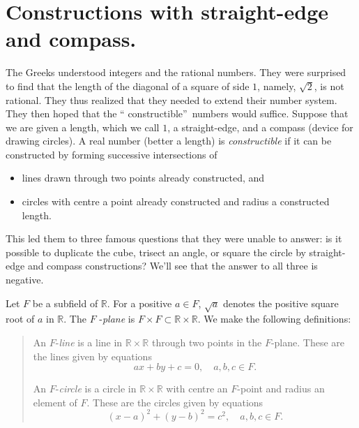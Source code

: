 \documentclass[a4paper,11pt,final,openany]{memoir}
\theoremstyle{nonumberplain}
\begin{document}
\section{Constructions with straight-edge and compass.}

The Greeks understood integers and the rational numbers. They were surprised
to find that the length of the diagonal of a square of side $1$, namely,
$\sqrt{2}$, is not rational. They thus realized that they needed to extend
their number system. They then hoped that the \textquotedblleft
constructible\textquotedblright\ numbers would suffice. Suppose that we are
given a length, which we call $1$, a straight-edge, and a compass (device for
drawing circles). A real number (better a length) is \emph{constructible\/}%
if it can be constructed by forming successive intersections of

\begin{itemize}
\item lines drawn through two points already constructed, and

\item circles with centre a point already constructed and radius a constructed length.
\end{itemize}

This led them to three famous questions that they were unable to answer: is it
possible to duplicate the cube, trisect an angle, or square the circle by
straight-edge and compass constructions? We'll see that the answer to all
three is negative.

Let $F$ be a subfield of $\mathbb{R}$. For a positive $a\in F$, $\sqrt{a}$
denotes the positive square root of $a$ in $\mathbb{R}{}$. The $F$%
-\emph{plane} is $F\times F\subset\mathbb{R}\times\mathbb{R}$. We make the
following definitions:

\begin{quotation}
\noindent An $F$-\emph{line} is a line in $\mathbb{R}{}\times\mathbb{R}{}$
through two points in the $F$-plane. These are the lines given by equations
\[
ax+by+c=0,\quad a,b,c\in F.
\]


\noindent An $F$-\emph{circle} is a circle in $\mathbb{R}{}\times\mathbb{R}{}$
with centre an $F$-point and radius an element of $F$. These are the circles
given by equations%
\[
(x-a)^{2}+(y-b)^{2}=c^{2},\quad a,b,c\in F.
\]



\end{quotation}
\end{document}
